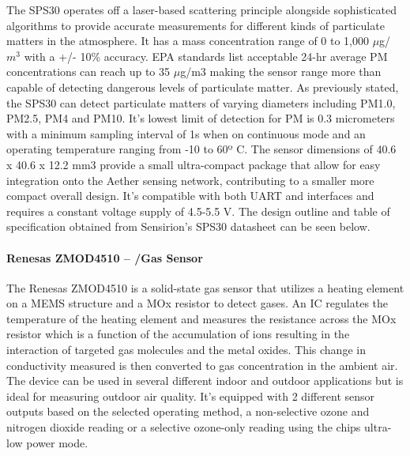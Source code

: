 The SPS30 operates off a laser-based scattering principle alongside sophisticated algorithms to provide accurate measurements for different kinds of particulate matters in the atmosphere. It has a mass concentration range of 0 to 1,000 $\mu$g/$m^3$ with a +/- 10\%  accuracy. EPA standards list acceptable 24-hr average PM concentrations can reach up to 35 $\mu$g/m3 making the sensor range more than capable of detecting dangerous levels of particulate matter. As previously stated, the SPS30 can detect particulate matters of varying diameters including PM1.0, PM2.5, PM4 and PM10. It’s lowest limit of detection for PM is 0.3 micrometers with a minimum sampling interval of 1s when on continuous mode and an operating temperature ranging from -10 to 60º C. The sensor dimensions of 40.6 x 40.6 x 12.2 mm3 provide a small ultra-compact package that allow for easy integration onto the Aether sensing network, contributing to a smaller more compact overall design. It’s compatible with both UART and \iic interfaces and requires a constant voltage supply of 4.5-5.5 V. The design outline and table of specification obtained from Sensirion’s SPS30 datasheet can be seen below.
	
\paragraph{Renesas ZMOD4510 – \ndo/\ozone Gas Sensor }
The Renesas ZMOD4510 is a solid-state gas sensor that utilizes a heating element on a MEMS structure and a MOx resistor to detect gases. An IC regulates the temperature of the heating element and measures the resistance across the MOx resistor which is a function of the accumulation of ions resulting in the interaction of targeted gas molecules and the metal oxides. This change in conductivity measured is then converted to gas concentration in the ambient air. The device can be used in several different indoor and outdoor applications but is ideal for measuring outdoor air quality. It’s equipped with 2 different sensor outputs based on the selected operating method, a non-selective ozone and nitrogen dioxide reading or a selective ozone-only reading using the chips ultra-low power mode.

